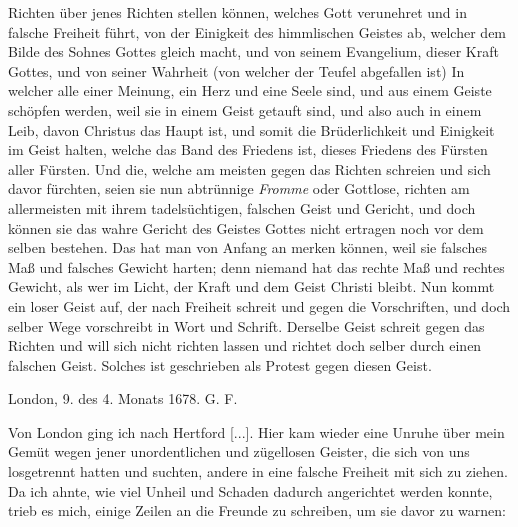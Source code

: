 {    Richten über jenes Richten stellen können, welches Gott
    verunehret und in falsche Freiheit 
    führt, von der Einigkeit des
    himmlischen Geistes ab, welcher dem Bilde des Sohnes Gottes
    gleich macht, und von seinem Evangelium, dieser Kraft Gottes,
    und von seiner Wahrheit (von welcher der Teufel abgefallen ist)
    In welcher alle einer Meinung, ein Herz und eine Seele sind, und
    aus einem Geiste schöpfen werden, weil sie in einem Geist
    getauft sind, und also auch in einem Leib, davon Christus das
    Haupt ist, und somit die Brüderlichkeit und Einigkeit im Geist
    halten, welche das Band des Friedens ist, dieses Friedens des
    Fürsten aller Fürsten. Und die, welche am meisten gegen das
    Richten schreien und sich davor fürchten, seien sie nun abtrünnige
    \textit{Fromme} oder Gottlose, richten am allermeisten mit ihrem
    tadelsüchtigen, falschen Geist und Gericht, 
    und doch können sie das
    wahre Gericht des Geistes Gottes nicht ertragen noch vor dem
    selben bestehen. Das hat man von Anfang an merken können,
    weil sie falsches Maß und falsches Gewicht harten; denn niemand
    hat das rechte Maß und rechtes Gewicht, als wer im Licht,
    der Kraft und dem Geist Christi bleibt. Nun kommt ein loser
    Geist auf, der nach Freiheit schreit und gegen die Vorschriften,
    und doch selber Wege vorschreibt in Wort und Schrift. Derselbe
    Geist schreit gegen das Richten und will sich nicht richten lassen
    und richtet doch selber durch einen falschen Geist. Solches ist
    geschrieben als Protest gegen diesen Geist.

    \bigskip 
    \begin{flushright}
    London, 9. des 4. Monats 1678. G. F.\end{flushright}
}

Von London ging ich nach Hertford [...]. Hier kam wieder
eine Unruhe über mein Gemüt wegen jener unordentlichen und
zügellosen Geister, die sich von uns losgetrennt hatten und suchten,
andere in eine falsche Freiheit mit sich zu ziehen. 
Da ich ahnte,
wie viel Unheil und Schaden dadurch angerichtet werden konnte,
trieb es mich, einige Zeilen an die Freunde zu schreiben, um sie
davor zu warnen:

